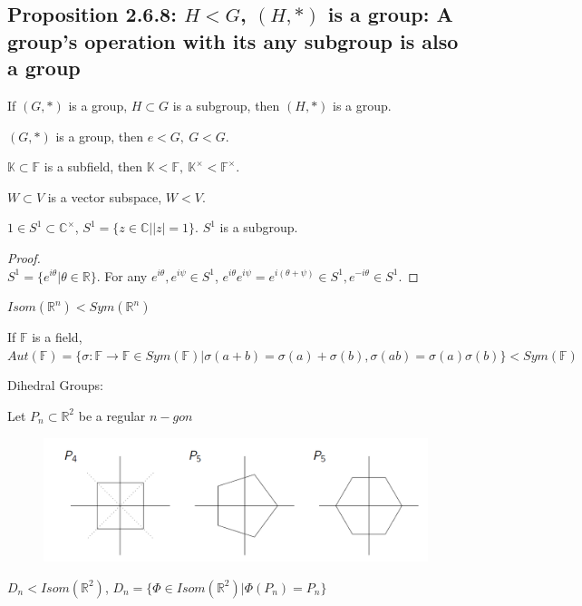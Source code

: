 \documentclass[11pt]{elegantbook}
\begin{document}
\subsection{Proposition 2.6.8: $H<G$, $(H,*)$ is a group: A group's operation with its any subgroup is also a group}
\begin{proposition}[Proposition 2.6.8]
    If $(G, *)$ is a group, $H \subset G$ is a subgroup, then $(H, *)$ is a group.
\end{proposition}
\begin{example}
    $(G,*)$ is a group, then ${e}<G,\ G<G$.
\end{example}
\begin{example}
$\mathbb{K}\subset \mathbb{F}$ is a subfield, then $\mathbb{K}<\mathbb{F},\ \mathbb{K}^{\times}<\mathbb{F}^{\times}$.
\end{example}
\begin{example}
$W\subset V$ is a vector subspace, $W<V$.
\end{example}
\begin{example}
$1\in S^1\subset \mathbb{C}^{\times}$, $S^1=\{z\in\mathbb{C}| |z|=1\}$. $S^1$ is a subgroup.
\end{example}
\begin{proof}
\quad\\
$S^1=\{e^{i\theta}| \theta\in \mathbb{R}\}$. For any $e^{i\theta}, e^{i\psi}\in S^1$, $e^{i\theta}e^{i\psi}=e^{i(\theta+\psi)}\in S^1, e^{-i\theta}\in S^1$.
\end{proof}
\begin{example}
$Isom(\mathbb{R}^n)<Sym(\mathbb{R}^n)$
\end{example}
\begin{example}
If $\mathbb{F}$ is a field, $Aut(\mathbb{F})=\{\sigma:\mathbb{F}\rightarrow	\mathbb{F}\in Sym(\mathbb{F})| \sigma(a+b)=\sigma(a)+\sigma(b), \sigma(ab)=\sigma(a)\sigma(b)\}<Sym(\mathbb{F})$
\end{example}
\begin{example}
    Dihedral Groups:
\end{example}
Let $P_n\subset \mathbb{R}^2$ be a regular $n-gon$
\begin{center}\begin{figure}[htbp]
    \centering
    \includegraphics[scale=0.8]{Dihedral Groups.png}
\end{figure}\end{center}
$D_n<Isom(\mathbb{R}^2)$, $D_n=\{\Phi \in Isom(\mathbb{R}^2)|\Phi(P_n)=P_n\}$
\end{document}
